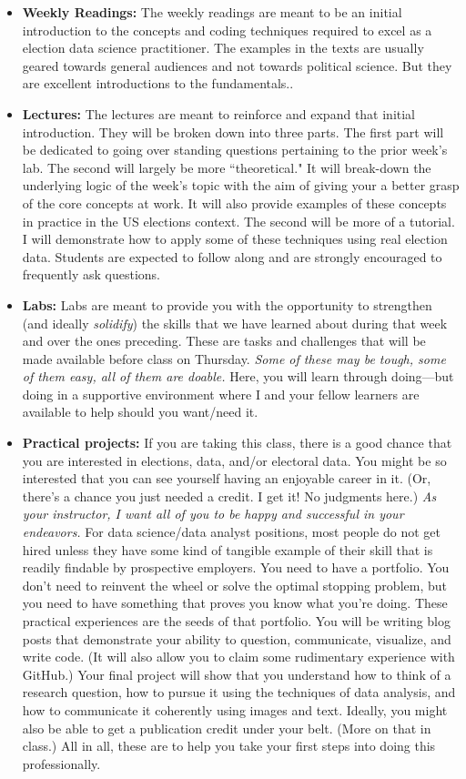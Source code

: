 \documentclass[11pt]{article}
\begin{document}
\begin{itemize}
\item \textbf{Weekly Readings:} The weekly readings are meant to be an initial introduction to the concepts and coding techniques required to excel as a election data science practitioner. The examples in the texts are usually geared towards general audiences and not towards political science. But they are excellent introductions to the fundamentals..
\item \textbf{Lectures:} The lectures are meant to reinforce and expand that initial introduction. They will be broken down into three parts. The first part will be dedicated to going over standing questions pertaining to the prior week's lab.
 The second will largely be more ``theoretical." It will break-down the underlying logic of the week's topic with the aim of giving your a better grasp of the core concepts at work. It will also provide examples of these concepts in practice in the US elections context. The second will be more of a tutorial. I will demonstrate how to apply some of these techniques using real election data. Students are expected to follow along and are strongly encouraged to frequently ask questions. 
\item \textbf{Labs:} Labs are meant to provide you with the opportunity to strengthen (and ideally \textit{solidify}) the skills that we have learned about during that week and over the ones preceding. These are tasks and challenges that will be made available before class on Thursday. \textit{Some of these may be tough, some of them easy, all of them are doable.} Here, you will learn through doing---but doing in a supportive environment where I and your fellow learners are available to help should you want/need it. 
\item \textbf{Practical projects:} If you are taking this class, there is a good chance that you are interested in elections, data, and/or electoral data. You might be so interested that you can see yourself having an enjoyable career in it. (Or, there's a chance you just needed a credit. I get it! No judgments here.) \textit{As your instructor, I want all of you to be happy and successful in your endeavors.} For data science/data analyst positions, most people do not get hired unless they have some kind of tangible example of their skill that is readily findable by prospective employers. You need to have a portfolio. You don't need to reinvent the wheel or solve the optimal stopping problem, but you need to have something that proves you know what you're doing. These practical experiences are the seeds of that portfolio. You will be writing blog posts that demonstrate your ability to question, communicate, visualize, and write code. (It will also allow you to claim some rudimentary experience with GitHub.) Your final project will show that you understand how to think of a research question, how to pursue it using the techniques of data analysis, and how to communicate it coherently using images and text. Ideally, you might also be able to get a publication credit under your belt. (More on that in class.) All in all, these are to help you take your first steps into doing this professionally. 
\end{itemize}
\end{document}
